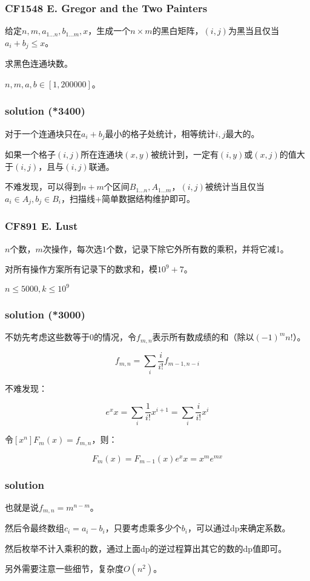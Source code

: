 \documentclass[10pt]{beamer}
\begin{document}
	\clearpage
	\begin{frame}
		\frametitle{CF1548 E. Gregor and the Two Painters}
	
		给定$n,m,a_{1\dots n},b_{1\dots m},x$，生成一个$n\times m$的黑白矩阵，$(i,j)$为黑当且仅当$a_i+b_j\le x$。
		
		求黑色连通块数。

		$n,m,a,b\in [1,200000]$。
	
	\end{frame}
	\clearpage
	\begin{frame}
		\frametitle{solution (*3400)}
	
		对于一个连通块只在$a_i+b_j$最小的格子处统计，相等统计$i,j$最大的。

		如果一个格子$(i,j)$所在连通块$(x,y)$被统计到，一定有$(i,y)$或$(x,j)$的值大于$(i,j)$，且与$(i,j)$联通。

		不难发现，可以得到$n+m$个区间$B_{1\dots n},A_{1\dots m}$，$(i,j)$被统计当且仅当$a_i\in A_j,b_j\in B_i$，扫描线+简单数据结构维护即可。
	
	\end{frame}
	\clearpage
	\begin{frame}
		\frametitle{CF891 E. Lust}
	
		$n$个数，$m$次操作，每次选$1$个数，记录下除它外所有数的乘积，并将它减1。

		对所有操作方案所有记录下的数求和，模$10^9+7$。

		$n\le 5000,k\le 10^9$
	
	\end{frame}
	\clearpage
	\begin{frame}
		\frametitle{solution (*3000)}
	
		不妨先考虑这些数等于0的情况，令$f_{m,n}$表示所有数成绩的和（除以$(-1)^mn!$）。

		$$
		f_{m,n}=\sum_i \dfrac{i}{i!}f_{m-1,n-i}
		$$

		不难发现：

		$$
		e^{x}x=\sum_i \dfrac{1}{i!}x^{i+1}=\sum_i \dfrac{i}{i!}x^i
		$$

		令$[x^n]F_m(x)=f_{m,n}$，则：
		
		$$
		F_m(x)=F_{m-1}(x)e^xx=x^me^{mx}
		$$
	
	\end{frame}
	\clearpage
	\begin{frame}
		\frametitle{solution}
	
		也就是说$f_{m,n}=m^{n-m}$。

		然后令最终数组$c_i=a_i-b_i$，只要考虑乘多少个$b_i$，可以通过dp来确定系数。

		然后枚举不计入乘积的数，通过上面dp的逆过程算出其它的数的dp值即可。

		另外需要注意一些细节，复杂度$O(n^2)$。

	\end{frame}
\end{document}
